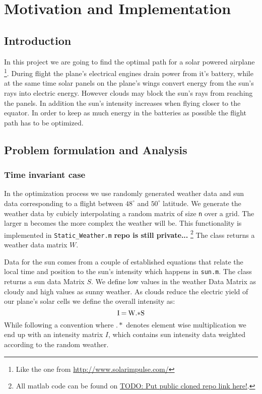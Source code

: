 \documentclass[ twoside,openright,titlepage,numbers=noenddot,headinclude,%
                footinclude=true,cleardoublepage=empty,abstractoff, %
                BCOR=5mm,paper=a4,fontsize=11pt,%
                ngerman,american,%
                ]{scrreprt}
\begin{document}
\frenchspacing
\raggedbottom
{} %
\pagestyle{plain}

%
\pagestyle{scrheadings}



\chapter{Motivation and Implementation}
\section{Introduction}
In this project we are going to find the optimal path for a solar powered airplane \footnote{Like the one from \url{http://www.solarimpulse.com/}}. During flight the plane's electrical engines drain power from it's battery, while at the same time solar panels on the plane's wings convert energy from the sun's rays into electric energy. However clouds may block the sun's rays from reaching the panels. In addition the sun's intensity increases when flying closer to the equator. In order to keep as much energy in the batteries as possible the flight path has to be optimized.

\section{Problem formulation and Analysis}
\subsection{Time invariant case}
In the optimization process we use randomly generated weather data and sun data corresponding to a flight between $48^\circ$ and $50^\circ$ latitude. We generate the weather data by cubicly interpolating a random matrix of size \texttt{n} over a grid. The larger n becomes the more complex the weather will be. This functionality is implemented in \texttt{Static\_Weather.m} \textbf{repo is still private...} \footnote{All matlab code can be found on \url{TODO: Put public cloned repo link here!}.} The class returns a weather data matrix $W$.

Data for the sun comes from a couple of established equations that relate the local time and position to the sun's intensity  which happens in \texttt{sun.m}. The class returns a sun data Matrix $S$. We define low values in the weather Data Matrix as cloudy and high values as sunny weather. As clouds reduce the electric yield of our plane's solar cells we define the overall intensity as:
\begin{equation}
$I$ \:= \: $W$ .* $S$
\end{equation}
While following a convention where $.*$ denotes element wise multiplication we end up with an intensity matrix $I$, which contains sun intensity data weighted according to the random weather.
\end{document}
